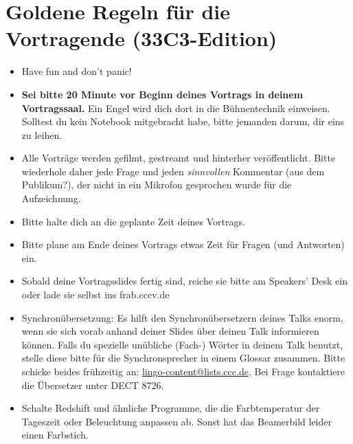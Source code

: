 \documentclass[paper=a4]{scrartcl}
\begin{document}
\section*{Goldene Regeln für die Vortragende (33C3-Edition)}
\begin{itemize}
	\item Have fun and don't panic!
	\item \textbf{Sei bitte 20 Minute vor Beginn deines Vortrags in deinem Vortragssaal.} Ein Engel wird dich dort in die Bühnentechnik einweisen. Solltest du kein Notebook mitgebracht habe, bitte jemanden darum, dir eins zu leihen.
	\item Alle Vorträge werden gefilmt, gestreamt und hinterher veröffentlicht. Bitte wiederhole daher jede Frage und jeden \textit{sinnvollen} Kommentar (aus dem Publikum?), der nicht in ein Mikrofon gesprochen wurde für die Aufzeichnung.
	\item Bitte halte dich an die geplante Zeit deines Vortrags.
	\item Bitte plane am Ende deines Vortrags etwas Zeit für Fragen (und Antworten) ein.
	\item Sobald deine Vortragsslides fertig sind, reiche sie bitte am Speakers' Desk ein oder lade sie selbst ins frab.cccv.de
	\item Synchronübersetzung: Es hilft den Synchronübersetzern deines Talks enorm, wenn sie sich vorab anhand deiner Slides über deinen Talk informieren können. Falls du spezielle unübliche (Fach-\nobreak) Wörter in deinem Talk benutzt, stelle diese bitte für die Synchronsprecher in einem Glossar zusammen. Bitte schicke beides frühzeitig an: \url{lingo-content@lists.ccc.de}. Bei Frage kontaktiere die Übersetzer unter DECT 8726.
	\item Schalte Redshift und ähnliche Programme, die die Farbtemperatur der Tageszeit oder Beleuchtung anpassen ab. Sonst hat das Beamerbild leider einen Farbstich.
\end{itemize}
\end{document}
